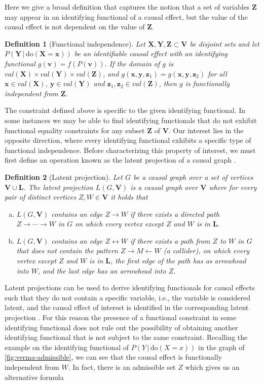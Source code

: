 \documentclass[11pt,a4paper,twoside]{article}
\newtheorem{definition}{Definition}
\newcommand{\+}[1]{\ensuremath{\mathbf{#1}}}
\newcommand{\doo}{\textrm{do}}
\newcommand{\given}{{ \, | \, }}
\begin{document}
	Here we give a broad definition that captures the notion that a set of variables $\+ Z$ may appear in an identifying functional of a causal effect, but the value of the causal effect is not dependent on the value of $\+ Z$. 
	\begin{definition}[Functional independence]
		Let $\+ X, \+Y, \+ Z \subset \+ V$ be disjoint sets and let ${P(\+Y \given \doo(\+ X  = \+ x))}$ be an identifiable causal effect with an identifying functional $g(\+ v) = f(P(\+ v))$. If the domain of $g$ is $val(\+ X) \times val(\+ Y) \times val(\+ Z)$, and $g(\+ x, \+ y, \+ z_1) = g(\+ x, \+ y, \+ z_2)$ for all $\+ x \in val(\+ X)$, $\+y \in val(\+ Y)$ and $\+ z_1,\+ z_2 \in val(\+ Z)$, then $g$ is \emph{functionally independent} from $\+ Z$. 
	\end{definition}
	The constraint defined above is specific to the given identifying functional. In some instances we may be able to find identifying functionals that do not exhibit functional equality constraints for any subset $\+ Z$ of $\+ V$. Our interest lies in the opposite direction, where every identifying functional exhibits a specific type of functional independence. Before characterizing this property of interest, we must first define an operation known as the latent projection of a causal graph \citep{pearl1991}.
	\begin{definition}[Latent projection] Let $G$ be a causal graph over a set of vertices $\+ V \cup \+ L$. The \emph{latent projection} $L(G, \+ V)$ is a causal graph over $\+ V$ where for every pair of distinct vertices $Z,W \in \+ V$ it holds that
		\begin{enumerate}[(a),leftmargin=*]
			\item $L(G, \+ V)$ contains an edge $Z \longrightarrow W$ if there exists a directed path $Z \longrightarrow \cdots \longrightarrow W$ in $G$ on which every vertex except $Z$ and $W$ is in $\+ L$.
			\item $L(G, \+ V)$ contains an edge $Z \longleftrightarrow W$ if there exists a path from $Z$ to $W$ in $G$ that does not contain the pattern $Z \longrightarrow M \longleftarrow W$ (a collider), on which every vertex except $Z$ and $W$ is in $\+ L$, the first edge of the path has as arrowhead into $W$, and the last edge has an arrowhead into $Z$.
		\end{enumerate}
	\end{definition}
	Latent projections can be used to derive identifying functionals for causal effects such that they do not contain a specific variable, i.e., the variable is considered latent, and the causal effect of interest is identified in the corresponding latent projection \citep{tikka18}. For this reason the presence of a functional constraint in some identifying functional does not rule out the possibility of obtaining another identifying functional that is not subject to the same constraint. Recalling the example on the identifying functional of $P(Y \given \doo(X = x))$ in the graph of \autoref{fig:verma-admissible}, we can see that the causal effect is functionally independent from $W$. In fact, there is an admissible set $Z$ which gives us an alternative formula
\end{document}
